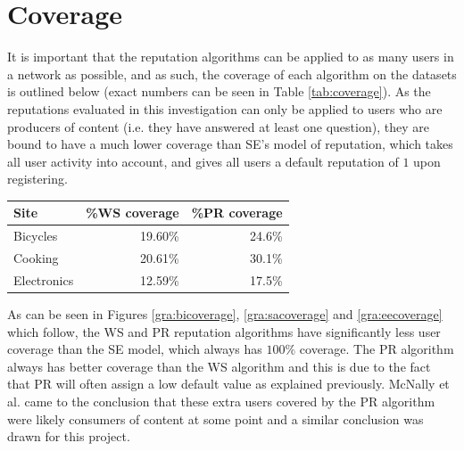 \documentclass[]{final_report}
\begin{document}
\section{Coverage}

It is important that the reputation algorithms can be applied to as many users in a network as possible, and as such, the coverage of each algorithm on the datasets is outlined below (exact numbers can be seen in Table \ref{tab:coverage}). As the reputations evaluated in this investigation can only be applied to users who are producers of content (i.e. they have answered at least one question), they are bound to have a much lower coverage than SE's model of reputation, which takes all user activity into account, and gives all users a default reputation of $1$ upon registering.

\begin{minipage}{\linewidth}
\centering
\begin{tabular}{|l|r|r|}
\hline \textbf{Site} & \textbf{\%WS coverage} & \textbf{\%PR coverage} \\ 
\hline Bicycles & 19.60\% & 24.6\% \\ 
\hline Cooking & 20.61\% & 30.1\% \\ 
\hline Electronics & 12.59\% & 17.5\% \\ 
\hline 
\end{tabular}\par
{} 
\label{tab:coverage}
\end{minipage}


As can be seen in Figures \ref{gra:bicoverage}, \ref{gra:sacoverage} and \ref{gra:eecoverage} which follow, the WS and PR reputation algorithms have significantly less user coverage than the SE model, which always has $100\%$ coverage. The PR algorithm always has better coverage than the WS algorithm and this is due to the fact that PR will often assign a low default value as explained previously. McNally et al. came to the conclusion that these extra users covered by the PR algorithm were likely consumers of content at some point and a similar conclusion was drawn for this project.
\end{document}
